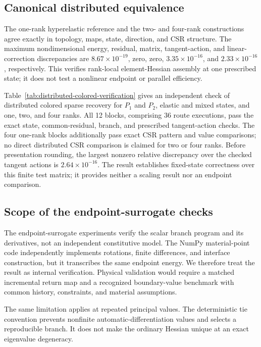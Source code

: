 \subsection{Canonical distributed equivalence}
\label{subsec:distributed-verification}

The one-rank hyperelastic reference and the two- and four-rank constructions
agree exactly in topology, maps, state, direction, and CSR structure. The
maximum nondimensional energy, residual, matrix, tangent-action, and linear-
correction discrepancies are $8.67\times10^{-19}$, zero, zero,
$3.35\times10^{-16}$, and $2.33\times10^{-16}$, respectively. This verifies
rank-local element-Hessian assembly at one prescribed state; it does not test a
nonlinear endpoint or parallel efficiency.

Table~\ref{tab:distributed-colored-verification} gives an independent check of
distributed colored sparse recovery for $P_1$ and $P_2$, elastic and mixed
states, and one, two, and four ranks. All 12 blocks, comprising 36 route
executions, pass the exact state, common-residual, branch, and prescribed
tangent-action checks. The four one-rank blocks additionally pass exact CSR
pattern and value comparisons; no direct distributed CSR comparison is claimed
for two or four ranks. Before presentation rounding, the largest nonzero
relative discrepancy over the checked tangent actions is
$2.64\times10^{-16}$. The result establishes fixed-state correctness over this
finite test matrix; it provides neither a scaling result nor an endpoint
comparison.

{

}

\subsection{Scope of the endpoint-surrogate checks}
\label{sec:val-plasticity3d}

The endpoint-surrogate experiments verify the scalar branch program and its
derivatives, not an independent constitutive model. The NumPy material-point
code independently implements rotations, finite differences, and interface
construction, but it transcribes the same endpoint energy. We therefore treat
the result as internal verification. Physical validation would require a
matched incremental return map and a recognized boundary-value benchmark with
common history, constraints, and material assumptions.

The same limitation applies at repeated principal values. The deterministic
tie convention prevents nonfinite automatic-differentiation values and selects
a reproducible branch. It does not make the ordinary Hessian unique at an
exact eigenvalue degeneracy.
